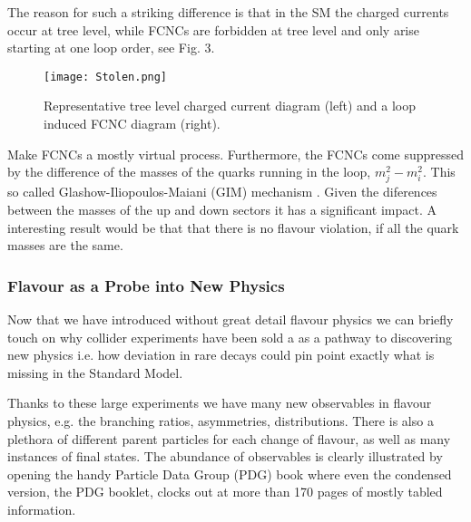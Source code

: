 The reason for such a striking difference is that in the SM the charged currents occur at tree level, while FCNCs are forbidden at tree level and only arise starting at one loop order, see Fig. 3.
%
\begin{figure}[H]
	\centering
	\texttt{[image: Stolen.png]}
	\caption{Representative tree level charged current diagram (left) and a loop induced FCNC diagram (right).}
	\label{fig:Flavour_D_1}
\end{figure}
%
Make FCNCs a mostly virtual process. Furthermore, the FCNCs come suppressed by the difference of the masses of the quarks running in the loop, $m^2_j-m^2_i$. This so called Glashow-Iliopoulos-Maiani (GIM) mechanism \cite{glashow1970weak}. Given the diferences between the masses of the up and down sectors it has a significant impact. A interesting result would be that that there is no flavour violation, if all the quark masses are the same.

\subsubsection{Flavour as a Probe into New Physics}

Now that we have introduced without great detail flavour physics we can briefly touch on why collider experiments have been sold a as a pathway to discovering new physics i.e. how deviation in rare decays could pin point exactly what is missing in the Standard Model. 

Thanks to these large experiments we have many new observables in flavour physics, e.g. the branching ratios, asymmetries, distributions. There is also a plethora of different parent particles for each change of flavour, as well as many instances of final states. 
%
The abundance of observables is clearly illustrated by opening the handy Particle Data Group (PDG) book \cite{Tanabashi2018} where even the condensed version, the PDG booklet, clocks out at more than 170 pages of mostly tabled information.



